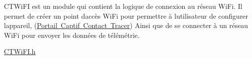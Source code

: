 CTWi\+FI est un module qui contient la logique de connexion au réseau Wi\+Fi. Il permet de créer un point d\textquotesingle{}accès Wi\+Fi pour permettre à l\textquotesingle{}utilisateur de configurer l\textquotesingle{}appareil, (\mbox{\hyperlink{_c_t_web_server}{Portail Captif Contact Tracer}}) Ainsi que de se connecter à un réseau Wi\+Fi pour envoyer les données de télémétrie.

\mbox{\hyperlink{_c_t_wi_fi_8h}{CTWi\+FI.\+h}} 